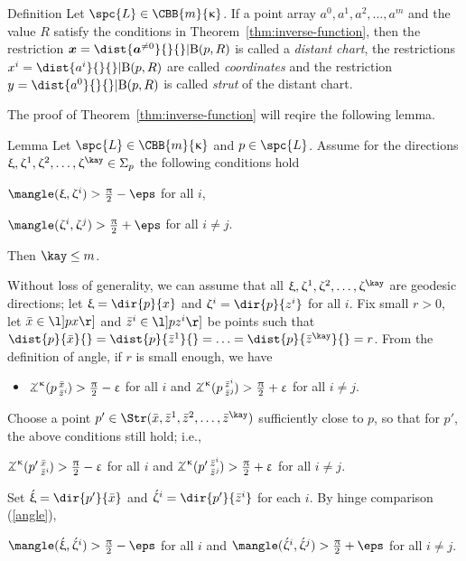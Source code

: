 \begin{thm}{Definition}\label{def:dist-chart}
Let $\spc{L}\in\CBB{m}{\kappa}$.
If a point array $a^0,a^1,a^2,\dots,a^m$ 
and the value $R$ satisfy the conditions in Theorem~\ref{thm:inverse-function}, 
then the restriction 
$\bm{x}=\dist{\bm{a}^{\without 0}}{}{}|\oBall(p,R)$
is called a \emph{distant chart},
the restrictions $x^i=\dist{a^i}{}{}|\oBall(p,R)$ are called \emph{coordinates}
and the restriction $y=\dist{a^0}{}{}|\oBall(p,R)$ is called \emph{strut} of the distant chart.
\end{thm}

The proof of Theorem~\ref{thm:inverse-function} will reqire the following lemma.

\begin{thm}{Lemma}\label{lem:pack(S^m)+}
Let $\spc{L}\in\CBB{m}{\kappa}$ and $p\in\spc{L}$.
Assume for the directions $\xi,\zeta^1,\zeta^2,\dots,\zeta^\kay\in\Sigma_p$ the following conditions hold 

\begin{subthm}{}
$\mangle(\xi,\zeta^i)>\tfrac\pi2-\eps$ for all $i$,
\end{subthm}

\begin{subthm}{}
$\mangle(\zeta^i,\zeta^j)>\tfrac\pi2+\eps$ for all $i\not=j$.
\end{subthm}
Then $\kay\le m$.
\end{thm}

Without loss of generality, we can assume that all $\xi,\zeta^1,\zeta^2,\dots,\zeta^\kay$ are geodesic directions;
let $\xi=\dir{p}{x}$ and $\zeta^i=\dir{p}{z^i}$ for all $i$.
Fix small $r>0$, 
let $\bar x\in \l]px\r]$ and $\bar z^i\in\l]p z^i\r]$ be points 
such that $\dist{p}{\bar x}{}=\dist{p}{\bar z^1}{}=\dots=\dist{p}{\bar z^\kay}{}=r$.
From the definition of angle,
if $r$ is small enough, we have
\begin{itemize}
\item $\angk\kappa{p}{\bar x}{\bar z^i}>\tfrac\pi2-\eps$ for all $i$
and $\angk\kappa{p}{\bar z^i}{\bar z^j}>\tfrac\pi2+\eps$ for all $i\not=j$.
\end{itemize}
Choose a point $p'\in\Str(\bar x,\bar z^1,\bar z^2,\dots,\bar z^\kay)$ sufficiently close to $p$,
so that for $p'$, the above conditions still hold; i.e.,
\begin{clm}{}
 $\angk\kappa{p'}{\bar x}{\bar z^i}>\tfrac\pi2-\eps$ for all $i$ and $\angk\kappa{p'}{\bar z^i}{\bar z^j}>\tfrac\pi2+\eps$ for all $i\not=j$.
\end{clm}
Set $\acute\xi=\dir{p'}{\bar x}$ and $\acute\zeta^i=\dir{p'}{\bar z^i}$ for each $i$.
By hinge comparison (\ref{angle}), 
\begin{clm}{}
$\mangle(\acute\xi,\acute\zeta^i)>\tfrac\pi2-\eps$ for all $i$ and $\mangle(\acute\zeta^i,\acute\zeta^j)>\tfrac\pi2+\eps$ for all $i\not=j$.
\end{clm}

